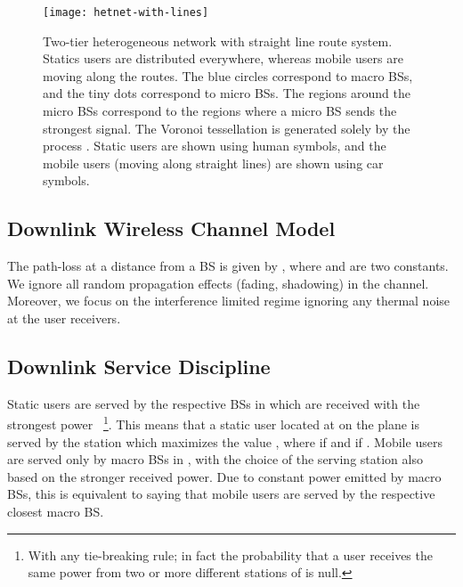 \documentclass[10pt,journal]{IEEEtran}
\begin{document}
\begin{figure}[t!]
\begin{center}
\begin{minipage}{1\linewidth}
\begin{center}
\centerline{\texttt{[image: hetnet-with-lines]}}
\vspace{-2ex}
\caption[Two-tier heterogeneous network with straight line route system]{Two-tier heterogeneous network with straight line route system.
Statics users are distributed everywhere, whereas mobile users are moving along the routes. The blue circles correspond to macro BSs, and the tiny 
dots correspond to micro BSs. The regions around the micro BSs correspond to the regions where a micro BS sends the strongest signal. 
The Voronoi tessellation is generated solely by the process . Static users are shown using human symbols, and the mobile 
users (moving along straight lines) are shown using car symbols.
\label{fig.hetnet-with-lines}}
\end{center}
\end{minipage}
\end{center}
\vspace{-2ex}
\end{figure}





\subsection{Downlink Wireless Channel Model}\label{subsection:channel-model}
The path-loss at a distance  from a  BS is given by , where  and  are two constants. 
We ignore all  random propagation effects (fading, shadowing) in the channel. Moreover, 
we focus on the interference limited regime ignoring any thermal noise at the user receivers. 


\subsection{Downlink Service Discipline}\label{subsection:service-discipline}
Static users are served by the respective  BSs in  which are received with the strongest power
~\footnote{With any tie-breaking rule; in fact the probability that a user receives the same power from two or more  different stations of  is null.}. 
This means that a static user located at  on the plane  
is served by the station  which maximizes
 the value 
, where  if
  and  if
 . 
Mobile users are served only by macro  BSs in , with the
choice of the serving station also based on the  stronger received
power. Due to constant power emitted by macro BSs, this is equivalent
to saying that mobile users are served by the respective closest macro BS.  
\end{document}
